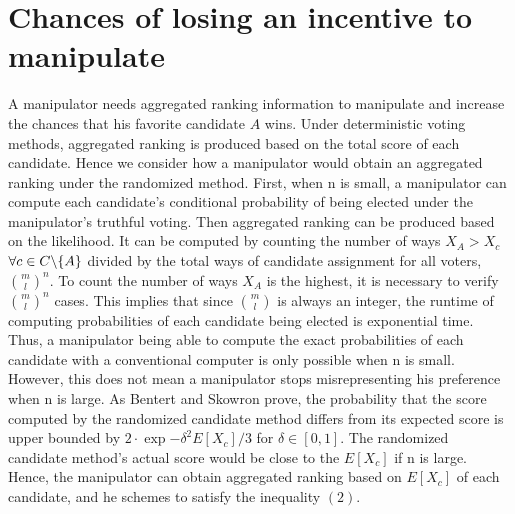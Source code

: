 \documentclass[letterpaper]{article} %
\begin{document}
\section{Chances of losing an incentive to manipulate}
A manipulator needs aggregated ranking information to manipulate and increase the chances that his favorite candidate $A$ wins. Under deterministic voting methods, aggregated ranking is produced based on the total score of each candidate. Hence we consider how a manipulator would obtain an aggregated ranking under the randomized method. First, when n is small, a manipulator can compute each candidate's conditional probability of being elected under the manipulator's truthful voting. Then aggregated ranking can be produced based on the likelihood. It can be computed by counting the number of ways $X_A > X_c$
$\forall c \in C \symbol{92}\text{\{} A\text{\}}$ divided by the total ways of candidate assignment for all voters, $\binom{m}{l}^n$. To count the number of ways $X_A$ is the highest, it is necessary to verify $\binom{m}{l}^n $ cases. This implies that since $\binom{m}{l}$ is always an integer, the runtime of computing probabilities of each candidate being elected is exponential time. Thus, a manipulator being able to compute the exact probabilities of each candidate with a conventional computer is only possible when n is small.\\
However, this does not mean a manipulator stops misrepresenting his preference when n is large. As Bentert and Skowron prove, the probability that the score computed by the randomized candidate method differs from its expected score is upper bounded by $2\cdot\exp{-\delta^2E[X_c]/3}$ for $\delta \in [0,1]$. The randomized candidate method's actual score would be close to the $E[X_c]$ if n is large. Hence, the manipulator can obtain aggregated ranking based on $E[X_c]$ of each candidate, and he schemes to satisfy the inequality $(2)$.
\end{document}
